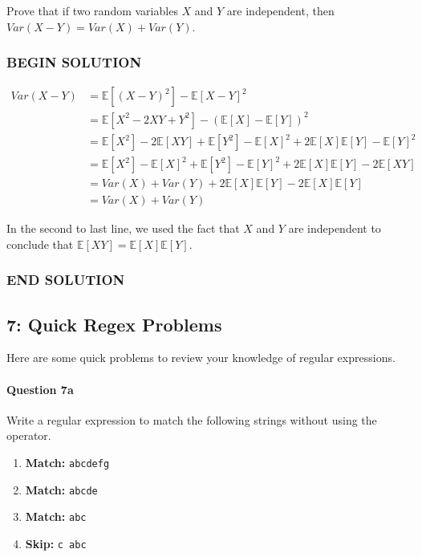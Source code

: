\documentclass[11pt]{article}
\providecommand{\tightlist}{%
      \setlength{\itemsep}{0pt}\setlength{\parskip}{0pt}}
\begin{document}
Prove that if two random variables \(X\) and \(Y\) are independent, then
\(Var(X - Y) = Var(X) + Var(Y)\).

    \subsubsection{BEGIN SOLUTION}\label{begin-solution}

\[
\begin{aligned}
Var(X - Y) &= \mathbb{E}[(X - Y)^2] - \mathbb{E}[X - Y]^2 \\
&= \mathbb{E}[X^2 - 2XY + Y^2] - (\mathbb{E}[X] - \mathbb{E}[Y])^2 \\
&= \mathbb{E}[X^2] - 2\mathbb{E}[XY] + \mathbb{E}[Y^2] - \mathbb{E}[X]^2 + 2\mathbb{E}[X]\mathbb{E}[Y] - \mathbb{E}[Y]^2 \\
&= \mathbb{E}[X^2] - \mathbb{E}[X]^2 + \mathbb{E}[Y^2] - \mathbb{E}[Y]^2 + 2\mathbb{E}[X]\mathbb{E}[Y] - 2\mathbb{E}[XY] \\
&= Var(X) + Var(Y) + 2\mathbb{E}[X]\mathbb{E}[Y] - 2\mathbb{E}[X]\mathbb{E}[Y] \\
&= Var(X) + Var(Y)
\end{aligned}
\]

In the second to last line, we used the fact that \(X\) and \(Y\) are
independent to conclude that
\(\mathbb{E}[XY] = \mathbb{E}[X]\mathbb{E}[Y]\).

\subsubsection{END SOLUTION}\label{end-solution}

    \subsection{7: Quick Regex Problems}\label{quick-regex-problems}

Here are some quick problems to review your knowledge of regular
expressions.

    \paragraph{Question 7a}\label{question-7a}

Write a regular expression to match the following strings without using
the \texttt{\textbar{}} operator.

\begin{enumerate}
\def\labelenumi{\arabic{enumi}.}
\tightlist
\item
  \textbf{Match:} \texttt{abcdefg}
\item
  \textbf{Match:} \texttt{abcde}
\item
  \textbf{Match:} \texttt{abc}
\item
  \textbf{Skip:} \texttt{c\ abc}
\end{enumerate}
\end{document}
